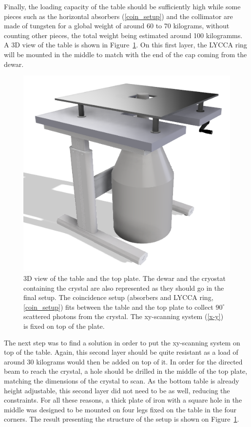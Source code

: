 \documentclass[11pt,a4paper]{article}
\begin{document}
Finally, the loading capacity of the table should be sufficiently high while some pieces such as the horizontal absorbers (\ref{coin_setup}) and the collimator are made of tungsten for a global weight of around 60 to 70 kilograms, without counting other pieces, the total weight being estimated around 100 kilogramms. A 3D view of the table is shown in Figure~\ref{table}. On this first layer, the LYCCA ring will be mounted in the middle to match with the end of the cap coming from the dewar.

\begin{figure}[!h]
\centering
\includegraphics[scale=0.5]{table.png}
\caption{3D view of the table and the top plate. The dewar and the cryostat containing the crystal are also represented as they should go in the final setup. The coincidence setup (absorbers and LYCCA ring, \ref{coin_setup}) fits between the table and the top plate to collect $90^{\circ}$ scattered photons from the crystal. The xy-scanning system (\ref{x-y}) is fixed on top of the plate.}
\label{table}
\end{figure}

The next step was to find a solution in order to put the xy-scanning system on top of the table. Again, this second layer should be quite resistant as a load of around 30 kilograms would then be added on top of it. In order for the directed beam to reach the crystal, a hole should be drilled in the middle of the top plate, matching the dimensions of the crystal to scan. As the bottom table is already height adjustable, this second layer did not need to be as well, reducing the constraints. For all these reasons, a thick plate of iron with a square hole in the middle was designed to be mounted on four legs fixed on the table in the four corners. The result presenting the structure of the setup is shown on Figure~\ref{table}.
\end{document}
